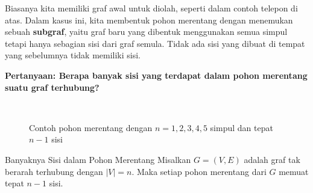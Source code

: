 Biasanya kita memiliki graf awal untuk diolah, seperti dalam contoh telepon di atas.  Dalam kasus ini, kita membentuk pohon merentang dengan menemukan sebuah \textbf{subgraf}, yaitu graf baru yang dibentuk menggunakan semua simpul tetapi hanya sebagian sisi dari graf semula.  Tidak ada sisi yang dibuat di tempat yang sebelumnya tidak memiliki sisi.

\textbf{Pertanyaan: Berapa banyak sisi yang terdapat dalam pohon merentang suatu graf terhubung?}

\begin{figure}[h!]
\centering
{}\\
\vspace{1cm}

\caption{Contoh pohon merentang dengan \( n = 1, 2, 3, 4, 5 \) simpul dan tepat \( n-1 \) sisi}
\end{figure}

\begin{lemma}{Banyaknya Sisi dalam Pohon Merentang}
Misalkan \( G = (V, E) \) adalah graf tak berarah terhubung dengan \( |V| = n \).  
Maka setiap pohon merentang dari \( G \) memuat tepat \( n - 1 \) sisi.
\end{lemma}

